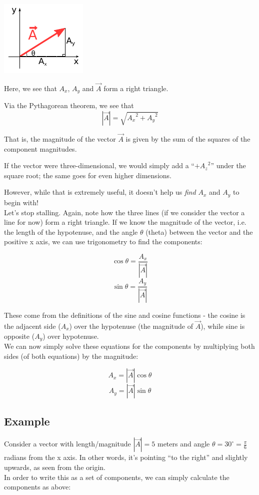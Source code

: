 \documentclass[8.01x]{subfiles}
\begin{document}
\includegraphics[scale=2]{Graphics/vectors/vectordecomp_trig}

Here, we see that $A_x$, $A_y$ and $\vec{A}$ form a right triangle.

Via the Pythagorean theorem, we see that
\[ |\vec{A}| = \sqrt{{A_x}^2 + {A_y}^2} \]

That is, the magnitude of the vector $\vec{A}$ is given by the sum of the squares of the component magnitudes.

If the vector were three-dimensional, we would simply add a ``$+ {A_z}^2$'' under the square root; the same goes for even higher dimensions.

However, while that is extremely useful, it doesn't help us \emph{find} $A_x$ and $A_y$ to begin with!\\
Let's stop stalling. Again, note how the three lines (if we consider the vector a line for now) form a right triangle. If we know the magnitude of the vector, i.e. the length of the hypotenuse, and the angle $\theta$ (theta) between the vector and the positive x axis, we can use trigonometry to find the components:

\[ \cos{\theta} = \frac{A_x}{|\vec{A}|} \]
\[ \sin{\theta} = \frac{A_y}{|\vec{A}|} \]

These come from the definitions of the sine and cosine functions - the cosine is the adjacent side ($A_x$) over the hypotenuse (the magnitude of $\vec{A}$), while sine is opposite ($A_y$) over hypotenuse.\\
We can now simply solve these equations for the components by multiplying both sides (of both equations) by the magnitude:

\[ A_x = |\vec{A}| \cos{\theta} \]
\[ A_y = |\vec{A}| \sin{\theta} \]

\subsection{Example}
Consider a vector with length/magnitude $|\vec{A}| = 5$ meters and angle $\displaystyle \theta = 30^{\circ} = \frac{\pi}{6}$ radians from the x axis. In other words, it's pointing ``to the right'' and slightly upwards, as seen from the origin.\\
In order to write this as a set of components, we can simply calculate the components as above:
\end{document}
